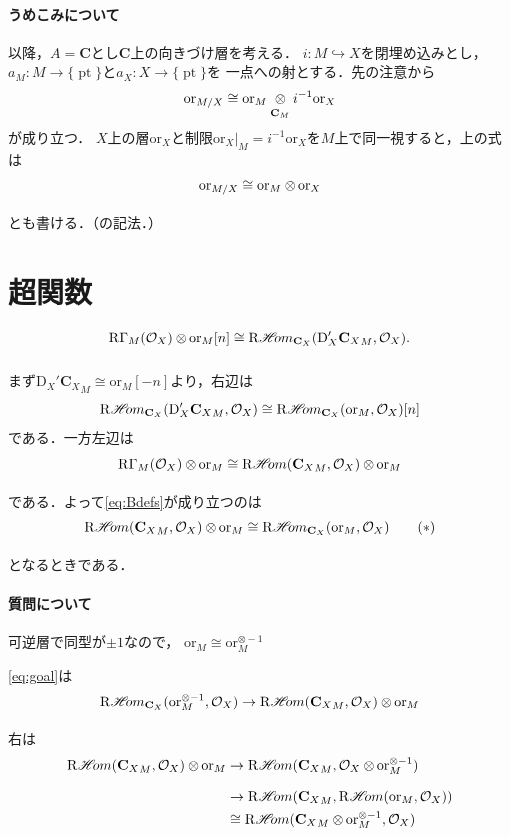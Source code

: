 \documentclass[uplatex,dvipdfmx,a4paper,10pt,draft]{jsarticle}
\makeatletter
\theoremstyle{definition}
\newcommand{\cc}{\mathbf{C}}
\newcommand{\mcal}{\mathcal}
\renewenvironment{proof}[1][\proofname]{\par
  \pushQED{\qed}%
  \normalfont \topsep6\p@\@plus6\p@\relax
  \trivlist
  \item[\hskip\labelsep
         \bfseries
    {#1}]\ignorespaces
}{%
  \popQED\endtrivlist\@endpefalse
}
\renewcommand{\proofname}{証明.}
\numberwithin{equation}{section}
\newcommand{\pt}{\mathop{\mathrm{pt}}\nolimits}
\newcommand{\cO}{\mcal{O}}
\newcommand{\HOM}{\mathop{\mathscr{H}\hspace{-2pt}om}\nolimits}%
\newcommand{\RHOM}{\mathop{\mathrm{R}\hspace{-1.5pt}\HOM}\nolimits}
\newcommand{\RG}{\mathop{\mathrm{R}\hspace{-0pt}\Gamma}\nolimits}
\newcommand{\rmD}{\mathrm{D}}
\newcommand{\ori}{\mathord{\mathrm{or}}}
\newcommand{\tens}[1][]{\mathbin{\otimes_{\raise1.5ex\hbox to-.1em{}{#1}}}}
\newcommand{\ttens}[1][]{\mathbin{\mathop{\overset{\mathrm{}}{\tens}}_{#1}}}
\newcommand{\mres}[2][]{{\left.{#1}\right\rvert}_{#2}}
\theoremstyle{mystyle}
\makeatother
\begin{document}
\paragraph{うめこみについて}
以降，\(A=\cc\)とし\(\cc\)上の向きづけ層を考える．
\(i\colon M\hookrightarrow X\)を閉埋め込みとし，
\(a_M\colon M\to\{\pt\}\)と\(a_X\colon X\to\{\pt\}\)を
一点への射とする．先の注意から
\[
    \ori_{M/X}\cong \ori_{M}\ttens[\cc_M]i^{-1}\ori_{X}
\]
が成り立つ．
\(X\)上の層\(\ori_X\)と制限\(
    \mres[\ori_{X}]{M}=i^{-1}\ori_{X}
\)を\(M\)上で同一視すると，上の式は
\begin{equation}\label{eq:rel-ori2}
    \ori_{M/X}\cong \ori_{M}\ttens \ori_{X}    
\end{equation}
とも書ける．（\cite[p.130]{KS90}の記法．）

\section{超関数}
\begin{equation}\label{eq:Bdefs}
    \RG_{M}(\cO_X)\ttens[]\ori_{M}[n]
    \cong 
    \RHOM_{\cc_X}(\rmD'_{X}{\cc_X}_M,\cO_X).
\end{equation}
\begin{proof}
    まず\(\rmD_{X}'{\cc_X}_{M}\cong\ori_{M}[-n]\)より，右辺は\[
        \RHOM_{\cc_X}(\rmD'_{X}{\cc_X}_M,\cO_X)
        \cong
        \RHOM_{\cc_X}(\ori_{M},\cO_X)[n]
    \]
    である．一方左辺は
    \[
        \RG_{M}(\cO_X)\ttens[]\ori_{M}
        \cong
        \RHOM({\cc_{X}}_{M},\cO_X)\ttens[]\ori_{M}
    \]である．よって\eqref{eq:Bdefs}が成り立つのは\[
        \RHOM({\cc_{X}}_{M},\cO_X)\ttens[]\ori_{M}
        \cong 
        \RHOM_{\cc_X}(\ori_{M},\cO_X)\tag{\(\ast\)}\label{eq:goal}
    \]となるときである．
\end{proof}

\paragraph{質問について}

可逆層で同型が\(\pm1\)なので，
\(\ori_M\cong\ori_{M}^{\otimes -1}\)

\eqref{eq:goal}は
\[
    \RHOM_{\cc_X}(\ori_{M}^{\otimes -1},\cO_X)%
    \to
    \RHOM({\cc_{X}}_{M},\cO_X)\ttens[]\ori_{M}
\]
右は
\begin{align*}
    \RHOM({\cc_{X}}_{M},\cO_X)\ttens[]\ori_{M}
    &\to
    \RHOM({\cc_{X}}_{M},\cO_X\ttens[]\ori_{M}^{\otimes -1})\\
    &\to
    \RHOM({\cc_{X}}_{M},\RHOM(\ori_{M},\cO_X))\\
    &\cong
    \RHOM({\cc_{X}}_{M}\tens[]\ori_{M}^{\otimes -1},\cO_X)
\end{align*}
\end{document}
